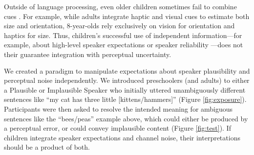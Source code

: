 \documentclass[man,floatsintext]{apa6}
\begin{document}
Outside of language processing, even older children sometimes fail to combine cues \cite{gori2008,nardini2008,nardini2010}. For example, while adults integrate haptic and visual cues to estimate both size and orientation, 8-year-olds rely exclusively on vision for orientation and haptics for size. Thus, children's successful use of independent information---for example, about high-level speaker expectations \cite{graham2014,matthews2010} or speaker reliability \cite{pasquini2007}---does not their guarantee integration with perceptual uncertainty.


We created a paradigm to manipulate expectations about speaker plausibility and perceptual noise independently. We introduced preschoolers (and adults) to either a Plausible or Implausible Speaker who initially uttered unambiguously different sentences like ``my cat has three little [kittens/hammers]'' (Figure \ref{fig:exposure}). Participants were then asked to resolve the intended meaning for ambiguous sentences like the ``bees/peas'' example above, which could either be produced by a perceptual error, or could convey implausible content (Figure \ref{fig:test}). If children integrate speaker expectations and channel noise, their interpretations should be a product of both.

\end{document}
